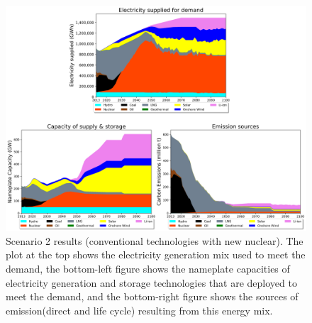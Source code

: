\begin{figure}[b!] 
\centering
\includegraphics[scale=0.5]{figures/conv_nuc}
\caption{Scenario 2 results (conventional technologies with new nuclear). The plot at the top shows the electricity generation mix used to meet the demand, the bottom-left figure shows the nameplate capacities of electricity generation and storage technologies that are deployed to meet the demand, and the bottom-right figure shows the sources of emission(direct and life cycle) resulting from this energy mix.}
\label{scen2}
\end{figure}


